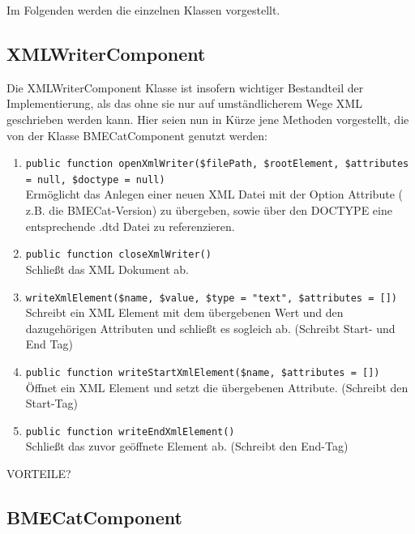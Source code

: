 	
	
	
	Im Folgenden werden die einzelnen Klassen vorgestellt.
	
	\subsection{XMLWriterComponent}
	
	Die XMLWriterComponent Klasse ist insofern wichtiger Bestandteil der Implementierung, als das ohne sie nur auf umständlicherem Wege XML geschrieben werden kann. Hier seien nun in Kürze jene Methoden vorgestellt, die von der Klasse BMECatComponent genutzt werden:
	
	\begin{enumerate}[noitemsep]
	\item \texttt{public function openXmlWriter(\$filePath, \$rootElement, \$attributes = null, \$doctype = null)} \\
		  Ermöglicht das Anlegen einer neuen XML Datei mit der Option Attribute ( z.B. die BMECat-Version) zu übergeben, sowie über den DOCTYPE eine entsprechende .dtd Datei zu referenzieren.
	\item \texttt{public function closeXmlWriter()} \\
		  Schließt das XML Dokument ab.
	\item \texttt{writeXmlElement(\$name, \$value, \$type = "text", \$attributes = [])}\\
		  Schreibt ein XML Element mit dem übergebenen Wert und den dazugehörigen Attributen und schließt es sogleich ab. (Schreibt Start- und End Tag)
	\item \texttt{public function writeStartXmlElement(\$name, \$attributes = [])}\\
		  Öffnet ein XML Element und setzt die übergebenen Attribute. (Schreibt den Start-Tag)
	\item \texttt{public function writeEndXmlElement()}\\
		  Schließt das zuvor geöffnete Element ab. (Schreibt den End-Tag)
	\end{enumerate}
	
	VORTEILE? 
	
	\subsection{BMECatComponent}
	
